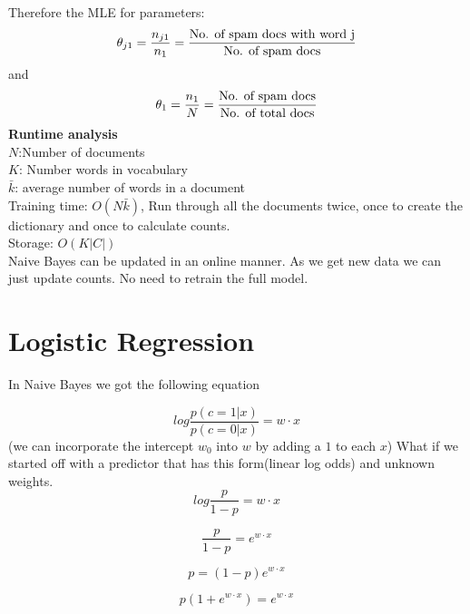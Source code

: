  
 Therefore the MLE for parameters:
   \begin{equation}
   \theta_{j1}=\frac{n_{j1}}{n_{1}}=\frac{\textnormal{No. of spam docs with word j}}{\textnormal{No. of spam docs}}
   \end{equation}
 and
    \begin{equation}
    \theta_{1}=\frac{n_{1}}{N}=\frac{\textnormal{No. of spam docs}}{\textnormal{No. of total docs}}
    \end{equation}
  \textbf{Runtime analysis}\\
  $N$:Number of documents\\
  $K$: Number words in vocabulary\\
  $\bar{k}$: average number of words in a document \\
  Training time: $O(N\bar{k})$, Run through all the documents twice, once to create the dictionary and once to calculate counts.\\
  Storage: $O(K|C|)$ \\
  Naive Bayes can be updated in an online manner. As we get new data we can just update counts. No need to retrain the full model.
  
   \section{Logistic Regression}
   In Naive Bayes we got the following equation 
   
   \begin{equation}
   log\frac{p(c=1|x)}{p(c=0|x)} = w \cdot x
   \end{equation} 
    (we can incorporate the intercept $w_{0}$ into $w$ by adding a $1$ to each $x$)
   What if we started off with a predictor that has this form(linear log odds) and unknown weights.\\
   
      \begin{equation}
      log\frac{p}{1-p} = w \cdot x
      \end{equation} 
    
      \begin{equation}
      \frac{p}{1-p} = e^{w \cdot x}
      \end{equation}   
   
      \begin{equation}
      p=(1-p) e^{w \cdot x}
      \end{equation} 
   
      \begin{equation}
      p(1+ e^{w \cdot x})=e^{w \cdot x}
      \end{equation}
 
